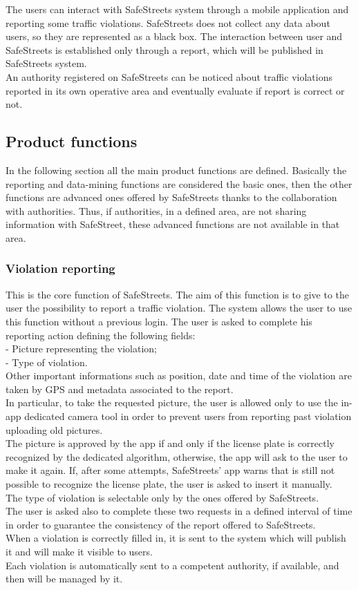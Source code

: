 \documentclass{article}
\begin{document}
    	The users can interact with SafeStreets system through a mobile application and reporting some traffic violations.
    	SafeStreets does not collect any data about users, so they are represented as a black box. The interaction between user and SafeStreets is established only through 
    	a report, which will be published in SafeStreets system.\\
    	An authority registered on SafeStreets can be noticed about traffic violations reported in its own operative area and eventually evaluate if report is correct or not.
        
        \subsection{Product functions}
        In the following section all the main product functions are defined. Basically the reporting and data-mining functions are considered the basic ones, then the other functions are advanced ones offered by SafeStreets thanks to the collaboration with authorities. Thus, if authorities, in a defined area, are not sharing information with SafeStreet, these advanced functions are not available in that area.
        \subsubsection{Violation reporting}
        This is the core function of SafeStreets. The aim of this function is to give to the user the possibility to report a traffic violation. The system allows the user to use this function without a previous login. The user is asked to complete his reporting action defining the following fields:\\
        - Picture representing the violation;\\
        - Type of violation.\\
        Other important informations such as position, date and time of the violation are taken by GPS and metadata associated to the report.\\
        In particular, to take the requested picture, the user is allowed only to use the in-app dedicated camera tool in order to prevent users from reporting past violation uploading old pictures.\\ The picture is approved by the app if and only if the license plate is correctly recognized by the dedicated algorithm, otherwise, the app will ask to the user to make it again. If, after some attempts, SafeStreets' app warns that is still not possible to recognize the license plate, the user is asked to insert it manually. \\The type of violation is selectable only by the ones offered by SafeStreets.\\ The user is asked also to complete these two requests in a defined interval of time in order to guarantee the consistency of the report offered to SafeStreets.\\
        When a violation is correctly filled in, it is sent to the system which will publish it and will make it visible to users.\\
         Each violation is automatically sent to a competent authority, if available, and then will be managed by it.
       
\end{document}
